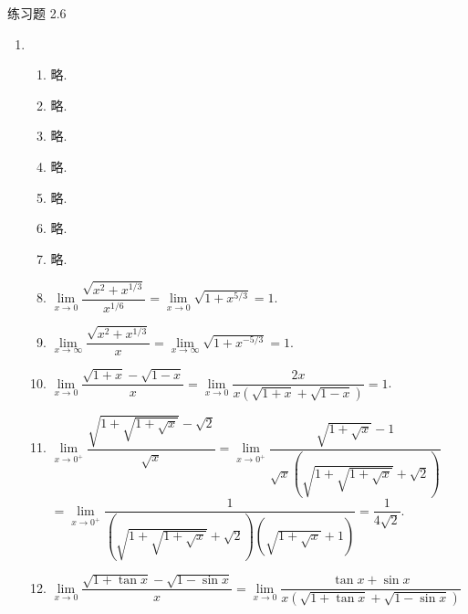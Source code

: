 



% 

\pagestyle{empty}

\begin{center}
    {\heiti 练习题 2.6}
\end{center}

\begin{enumerate}
    \item %
        \begin{enumerate}[(1)]
            \item %
                略.
            \item %
                略.
            \item %
                略.
            \item %
                略.
            \item %
                略.
            \item %
                略.
            \item %
                略.
            \item %
                $\lim\limits_{x\to0}\dfrac{\sqrt{x^2 + x^{1/3}}}{x^{1/6}} = \lim\limits_{x\to0}\sqrt{1 + x^{5/3}} = 1$.
            \item %
                $\lim\limits_{x\to\infty}\dfrac{\sqrt{x^2 + x^{1/3}}}{x} = \lim\limits_{x\to\infty}\sqrt{1 + x^{-5/3}} = 1$.
            \item %
                $\lim\limits_{x\to0}\dfrac{\sqrt{1+x} - \sqrt{1-x}}{x} = \lim\limits_{x\to0} \dfrac{2x}{x(\sqrt{1+x} + \sqrt{1-x})} = 1$.
            \item %
                $\lim\limits_{x\to0^+}\dfrac{\sqrt{1+\sqrt{1+\sqrt{x}}} - \sqrt{2}}{\sqrt{x}} = \lim\limits_{x\to0^+} \dfrac{\sqrt{1 + \sqrt{x}} - 1}{\sqrt{x}\left(\sqrt{1+\sqrt{1+\sqrt{x}}} + \sqrt{2}\right)}$ \\
                $= \lim\limits_{x\to0^+} \dfrac{1}{\left(\sqrt{1+\sqrt{1+\sqrt{x}}} + \sqrt{2}\right)\left(\sqrt{1 + \sqrt{x}} + 1\right)} = \dfrac{1}{4\sqrt{2}}$.
            \item %
                $\lim\limits_{x\to0}\dfrac{\sqrt{1+\tan x} - \sqrt{1-\sin x}}{x} = \lim\limits_{x\to0}\dfrac{\tan x + \sin x}{x(\sqrt{1+\tan x} + \sqrt{1-\sin x})}$ \\

\end{enumerate}
\end{enumerate}
